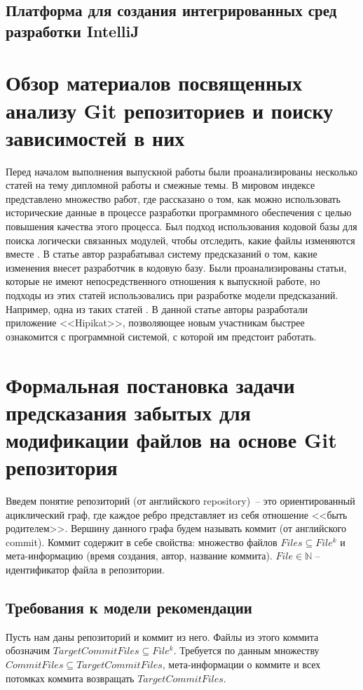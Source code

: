     \subsection{Платформа для создания интегрированных сред разработки IntelliJ}


\section{Обзор материалов посвященных анализу Git репозиториев и поиску зависимостей в них}
Перед началом выполнения выпускной работы были проанализированы несколько статей на тему дипломной работы и смежные темы. В мировом индексе представлено множество работ, где рассказано о том, как можно использовать исторические данные в процессе разработки программного обеспечения с целью повышения качества этого процесса. Был подход использования кодовой базы для поиска логически связанных модулей, чтобы отследить, какие файлы изменяются вместе \cite{logical-modules}. В статье \cite{source-change} автор разрабатывал систему предсказаний о том, какие изменения внесет разработчик в кодовую базу. Были проанализированы статьи, которые не имеют непосредственного отношения к выпускной работе, но подходы из этих статей использовались при разработке модели предсказаний. Например, одна из таких статей \cite{project-memory}. В данной статье авторы разработали приложение <<Hipikat>>, позволяющее новым участникам быстрее ознакомится с программной системой, с которой им предстоит работать.


\section{Формальная постановка задачи предсказания забытых для модификации файлов на основе Git репозитория}
Введем понятие репозиторий (от английского repository)~-- это ориентированный ациклический граф, где каждое ребро представляет из себя отношение <<быть родителем>>. Вершину данного графа будем называть коммит (от английского commit). Коммит содержит в себе свойства: множество файлов $Files \subseteq File^k$ и мета-информацию (время создания, автор, название коммита). $File \in \mathbb{N}$ -- идентификатор файла в репозитории.\\
\subsection{Требования к модели рекомендации}\label{ml-model-req}
Пусть нам даны репозиторий и коммит из него. Файлы из этого коммита обозначим $TargetCommitFiles \subseteq File^k$. Требуется по данным множеству $CommitFiles \subseteq TargetCommitFiles$, мета-информации о коммите и всех потомках коммита возвращать $TargetCommitFiles$.
